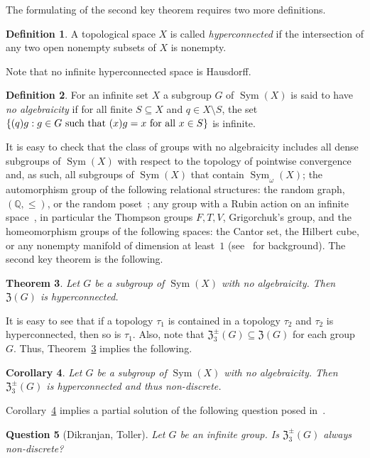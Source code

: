 \documentclass[11pt]{amsart}
\newtheorem{theorem}{Theorem}[section]
\newtheorem{corollary}[theorem]{Corollary}
\newtheorem{question}[theorem]{Question}
\theoremstyle{definition}
\newtheorem{definition}[theorem]{Definition}
\newcommand{\Q}{\mathbb Q}
\newcommand{\Sym}{\operatorname{Sym}}
\begin{document}
The formulating of the second key theorem requires two more definitions. 
\begin{definition}
 A topological space $X$ is called {\em hyperconnected} if the intersection of any two open nonempty subsets of $X$ is nonempty.   
\end{definition}
 Note that no infinite hyperconnected space is Hausdorff. 
\begin{definition}
    For an infinite set $X$ a subgroup $G$ of $\Sym(X)$ is said to have {\em no algebraicity} if for all finite $S\subseteq X$ and $q\in X\setminus S$, the set 
$\{(q)g: g\in G \hbox{ such that } (x)g=x \hbox{ for all }x\in S\}$ is infinite.
\end{definition}
 It is easy to check that the class of groups with no algebraicity includes all dense subgroups of $\Sym(X)$ with respect to the topology of pointwise convergence and, as such, all subgroups of $\Sym(X)$ that contain $\Sym_\omega(X)$; the automorphism group of the following relational structures: the random graph, \((\Q,\leq)\), or the random poset~\cite{PS2}; any group with a Rubin action on an infinite space~\cite{rubin}, in particular the Thompson groups \(F, T, V\), Grigorchuk’s group, and the homeomorphism groups of the following spaces: the Cantor set, the Hilbert cube, or any nonempty manifold of dimension at least~\(1\) (see~\cite{Thompson, Grigorchuk} for background). The second key theorem is the following.
    
  
\begin{theorem}\label{hype}
Let $G$ be a subgroup of $\Sym(X)$ with no algebraicity. Then $\mathfrak{Z}(G)$ is hyperconnected.
\end{theorem}

It is easy to see that if a topology $\tau_1$ is contained in a topology $\tau_2$ and $\tau_2$ is hyperconnected, then so is $\tau_1$. Also, note that $\mathfrak{Z}^{\pm}_{3}(G)\subseteq \mathfrak{Z}(G)$ for each group $G$. Thus, Theorem~\ref{hype} implies the following.

\begin{corollary}\label{CorolD}
Let $G$ be a subgroup of $\Sym(X)$ with no algebraicity. Then $\mathfrak{Z}^{\pm}_{3}(G)$ is hyperconnected and thus non-discrete.
\end{corollary}

Corollary~\ref{CorolD} implies a partial solution of the following question posed in~\cite[Question 2.2]{DikranjanToller}.  

\begin{question}[Dikranjan, Toller]
Let $G$ be an infinite group. Is $\mathfrak{Z}_{3}^{\pm}(G)$ always non-discrete?   
\end{question}
\end{document}
